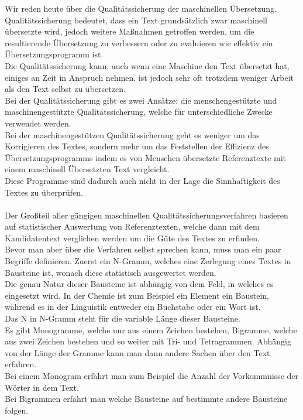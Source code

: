 \documentclass{article}
\title{\vspace{-3cm}}
\author{Andreas Hofer}
\begin{document}
Wir reden heute über die Qualitätssicherung der maschinellen Übersetzung. Qualitätssicherung bedeutet, dass ein Text grundsätzlich zwar maschinell übersetzte wird, jedoch weitere Maßnahmen getroffen werden, um die resultierende Übersetzung zu verbessern oder zu evaluieren wie effektiv ein Übersetzungsprogramm ist. \\
Die Qualitätssicherung kann, auch wenn eine Maschine den Text übersetzt hat, einiges an Zeit in Anspruch nehmen, ist jedoch sehr oft trotzdem weniger Arbeit als den Text selbst zu übersetzen. \\
Bei der Qualitätssicherung gibt es zwei Ansätze: die menschengestützte und maschinengestützte Qualitätssicherung, welche für unterschiedliche Zwecke verwendet werden. \\
Bei der maschinengestützen Qualitätssicherung geht es weniger um das Korrigieren des Textes, sondern mehr um das Feststellen der Effizienz des Übersetzungsprogramms indem es von Menschen übersetzte Referenztexte mit einem maschinell Übersetzten Text vergleicht. \\
Diese Programme sind dadurch auch nicht in der Lage die Sinnhaftigkeit des Textes zu überprüfen.\\
\\
Der Großteil aller gängigen maschinellen Qualitätssicherungsverfahren basieren auf statistischer Auswertung von Referenztexten, welche dann mit dem Kandidatentext verglichen werden um die Güte des Textes zu erfinden. \\
Bevor man aber über die Verfahren selbst sprechen kann, muss man ein paar Begriffe definieren. Zuerst ein N-Gramm, welches eine Zerlegung eines Textes in Bausteine ist, wonach diese statistisch ausgewertet werden. \\
Die genau Natur dieser Bausteine ist abhängig von dem Feld, in welches es eingesetzt wird. In der Chemie ist zum Beispiel ein Element ein Baustein, während es in der Linguistik entweder ein Buchstabe oder ein Wort ist. \\
Das N in N-Gramm steht für die variable Länge dieser Bausteine. \\
Es gibt Monogramme, welche nur aus einem Zeichen bestehen, Bigramme, welche aus zwei Zeichen bestehen und so weiter mit Tri- und Tetragrammen. 
Abhängig von der Länge der Gramme kann man dann andere Sachen über den Text erfahren. \\
Bei einem Monogram erfährt man zum Beispiel die Anzahl der Vorkommnisse der Wörter in dem Text. \\
Bei Bigrammen erfährt man welche Bausteine auf bestimmte andere Bausteine folgen. \\
\end{document}
